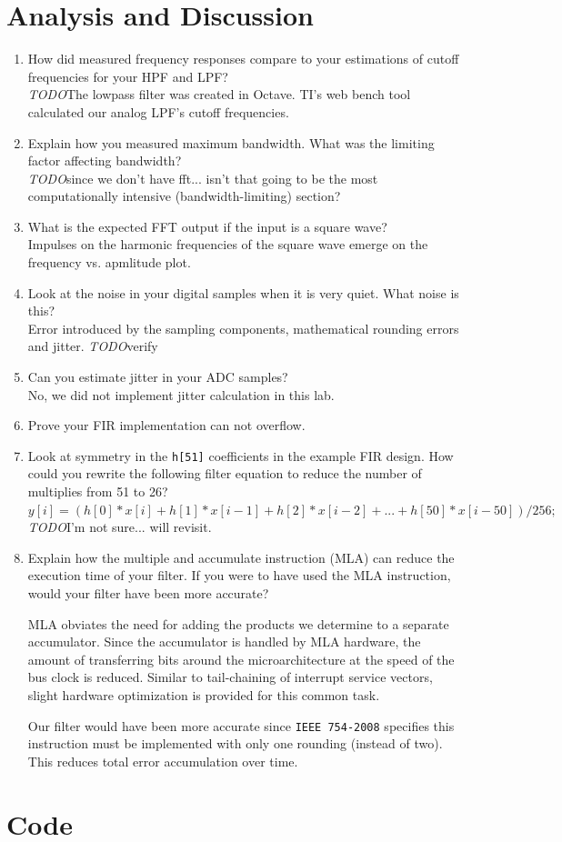 \documentclass[12pt]{article}
\newcommand{\todo}{{\LARGE \emph{\color{red}TODO}}}
\begin{document}
\section{Analysis and Discussion}
\begin{enumerate}[1)]
\item How did measured frequency responses compare to your estimations
  of cutoff frequencies for your HPF and LPF? \\
  \todo The lowpass filter was created in Octave. TI's web bench tool
  calculated our analog LPF's cutoff frequencies.
\item Explain how you measured maximum bandwidth. What was the
  limiting factor affecting bandwidth? \\
  \todo since we don't have fft... isn't that going to be the most
  computationally intensive (bandwidth-limiting) section?
  \item What is the expected FFT output if the input is a square wave? \\
  Impulses on the harmonic frequencies of the square wave emerge on
  the frequency vs. apmlitude plot.
\item Look at the noise in your digital samples when it is very
  quiet. What noise is this? \\
  Error introduced by the sampling components, mathematical rounding
  errors and jitter. \todo verify
\item Can you estimate jitter in your ADC samples? \\
  No, we did not implement jitter calculation in this lab.
\item Prove your FIR implementation can not overflow. \\
\item Look at symmetry in the \verb|h[51]| coefficients in the example
  FIR design. How could you rewrite the following filter equation to
  reduce the number of multiplies from 51 to 26?
  $y[i]=(h[0]*x[i]+h[1]*x[i-1]+h[2]*x[i-2]+...+h[50]*x[i-50])/256;$ \\
  \todo I'm not sure... will revisit.
\item Explain how the multiple and accumulate instruction (MLA) can
  reduce the execution time of your filter. If you were to have used
  the MLA instruction, would your filter have been more accurate?

  MLA obviates the need for adding the products we determine to a
  separate accumulator. Since the accumulator is handled by MLA
  hardware, the amount of transferring bits around the
  microarchitecture at the speed of the bus clock is reduced. Similar
  to tail-chaining of interrupt service vectors, slight hardware
  optimization is provided for this common task.

  Our filter would have been more accurate since \verb|IEEE 754-2008|
  specifies this instruction must be implemented with only one
  rounding (instead of two). This reduces total error accumulation
  over time.
\end{enumerate}

\section{Code}

\end{document}
